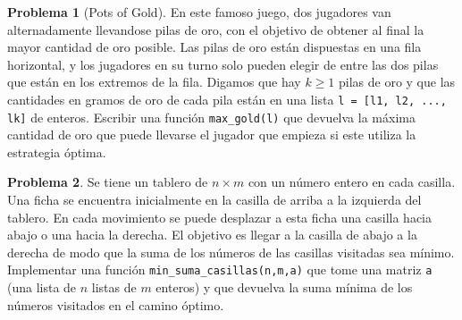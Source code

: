 \documentclass[a4paper, 11pt]{article}
\newcounter{numerodetema}
\theoremstyle{plain}
\theoremstyle{definition}
\newtheorem{prob}{Problema}[numerodetema]
\begin{document}
\begin{prob}[Pots of Gold]
En este famoso juego, dos jugadores van alternadamente llevandose pilas de oro,
con el objetivo de obtener al final la mayor cantidad de oro posible. Las pilas de
oro están dispuestas en una fila horizontal, y los jugadores en su turno solo pueden
elegir de entre las dos pilas que están en los extremos de la fila. Digamos que hay
$k\geq1$ pilas de oro y que las cantidades en gramos de oro de cada pila están en
una lista \texttt{l = [l1, l2, ..., lk]} de enteros. Escribir una función
\texttt{max\_gold(l)} que devuelva la máxima cantidad de oro que puede
llevarse el jugador que empieza si este utiliza la estrategia óptima.
\end{prob}

\begin{prob}
Se tiene un tablero de $n\times m$ con un número entero en cada casilla. Una ficha
se encuentra inicialmente en la casilla de arriba a la izquierda del tablero. En cada
movimiento se puede desplazar a esta ficha una casilla hacia abajo o una hacia la
derecha. El objetivo es llegar a la casilla de abajo a la derecha de modo que la suma
de los números de las casillas visitadas sea mínimo. Implementar una función 
\texttt{min\_suma\_casillas(n,m,a)} que tome una matriz \texttt{a} (una lista
de $n$ listas de $m$ enteros) y que devuelva la suma mínima de los números
visitados en el camino óptimo.
\end{prob}
\end{document}
